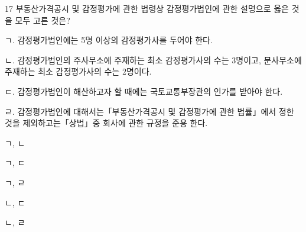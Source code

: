\begin{question}{17}
부동산가격공시 및 감정평가에 관한 법령상 감정평가법인에 관한 설명으로 옳은 것을 모두 고른 것은?
\begin{framedtext}
ㄱ. 감정평가법인에는 5명 이상의 감정평가사를 두어야 한다. \par
ㄴ. 감정평가법인의 주사무소에 주재하는 최소 감정평가사의 수는 3명이고, 분사무소에 주재하는 최소 감정평가사의 수는 2명이다. \par
ㄷ. 감정평가법인이 해산하고자 할 때에는 국토교통부장관의 인가를 받아야 한다. \par
ㄹ. 감정평가법인에 대해서는「부동산가격공시 및 감정평가에 관한 법률」에서 정한 것을 제외하고는「상법」중 회사에 관한 규정을 준용 한다. \par
\end{framedtext}
\begin{choices}
  \item ㄱ, ㄴ
  \item ㄱ, ㄷ
  \item ㄱ, ㄹ
  \item ㄴ, ㄷ
  \item ㄴ, ㄹ
\end{choices}
\end{question}
